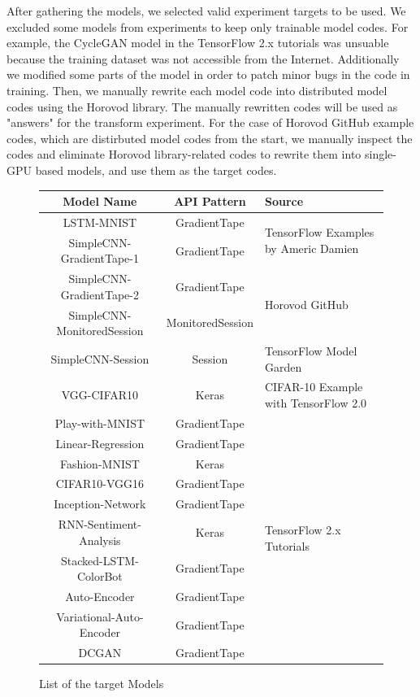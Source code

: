 After gathering the models, we selected valid experiment targets to be used. 
We excluded some models from experiments to keep only trainable model codes. 
For example, the CycleGAN model in the TensorFlow 2.x tutorials
was unsuable because the training dataset was not accessible from the
Internet. Additionally we modified some parts of the model in order to patch
minor bugs in the code in training.
Then, we manually rewrite each model code into distributed model codes using
the Horovod library. The manually rewritten codes will be used as "answers" 
for the transform experiment.
For the case of Horovod GitHub example codes, which are distirbuted model
codes from the start, we manually inspect the codes and eliminate
Horovod library-related codes to rewrite them into single-GPU based
models, and use them as the target codes.

\begin{figure}[!ht]
  \begin{center}
  \begin{tabular}{c|c|l}
    \hline
    Model Name & API Pattern & Source \\
    \hline
    LSTM-MNIST & GradientTape & \multirow{2}{*}{TensorFlow Examples by Americ Damien\cite{tfexamplesdamien}} \\
    SimpleCNN-GradientTape-1 & GradientTape \\
    \hline
    SimpleCNN-GradientTape-2 & GradientTape & \multirow{2}{*}{Horovod GitHub\cite{horovodgithub}} \\
    SimpleCNN-MonitoredSession & MonitoredSession  \\
    \hline
    SimpleCNN-Session & Session & TensorFlow Model Garden\cite{tfmodelgarden} \\
    \hline
    VGG-CIFAR10 & Keras & CIFAR-10 Example with TensorFlow 2.0\cite{cifar10github} \\
    \hline
    Play-with-MNIST & GradientTape & \multirow{10}{*}{TensorFlow 2.x Tutorials\cite{tf2tutogithub}} \\
    Linear-Regression & GradientTape  \\
    Fashion-MNIST & Keras  \\
    CIFAR10-VGG16 & GradientTape \\
    Inception-Network & GradientTape  \\
    RNN-Sentiment-Analysis & Keras  \\
    Stacked-LSTM-ColorBot & GradientTape  \\
    Auto-Encoder & GradientTape  \\
    Variational-Auto-Encoder & GradientTape  \\
    DCGAN & GradientTape  \\
    \hline
  \end{tabular}
  \end{center}
  \caption{List of the target Models}
  \label{fig:eval:targets}
\end{figure}

